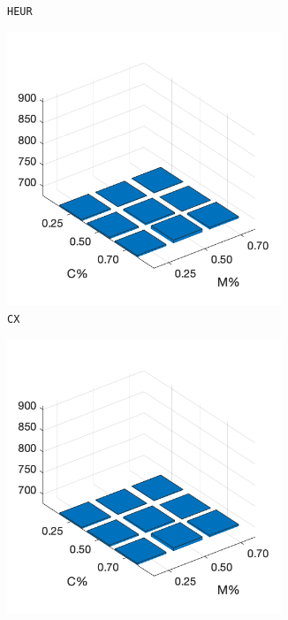 \begin{figure}
\begin{subfigure}[b]{0.25\textwidth}
		\caption{\texttt{HEUR}}
		\label{fig:x}
    	\end{subfigure}
%
	\begin{subfigure}[b]{0.25\textwidth}
		\centering
		\includegraphics[width=0.9\textwidth]{crossover/cross_unnamed_1.png}
		\caption{\texttt{CX}}
		\label{fig:y}
    	\end{subfigure}
%
	\begin{subfigure}[b]{0.25\textwidth}
		\centering
		\includegraphics[width=0.9\textwidth]{crossover/cross_unnamed_1.png}

\end{subfigure}
\end{figure}

